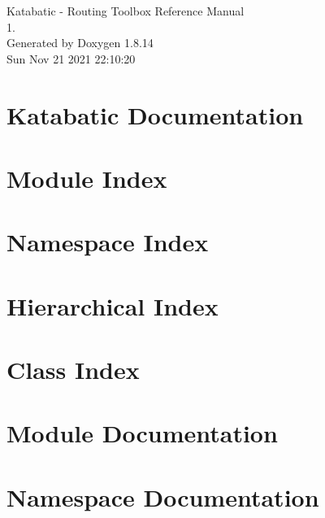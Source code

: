 \documentclass[a4paper]{asimbook}
\begin{document}
   \begin{titlepage}
     \vspace*{7cm}
     \begin{center}
     {\Large Katabatic -\/ Routing Toolbox Reference Manual\\[1ex]\large 1. }\\
     \vspace*{1cm}
     {\large Generated by Doxygen 1.8.14}\\
     \vspace*{0.5cm}
     {\small Sun Nov 21 2021 22:10:20}\\
     \end{center}
   \end{titlepage}

   \clearemptydoublepage

   \tableofcontents
   \clearemptydoublepage

\chapter{Katabatic Documentation}
\label{index}\hypertarget{index}{}
\chapter{Module Index}

\chapter{Namespace Index}

\chapter{Hierarchical Index}

\chapter{Class Index}

\chapter{Module Documentation}


\chapter{Namespace Documentation}







\end{document}
